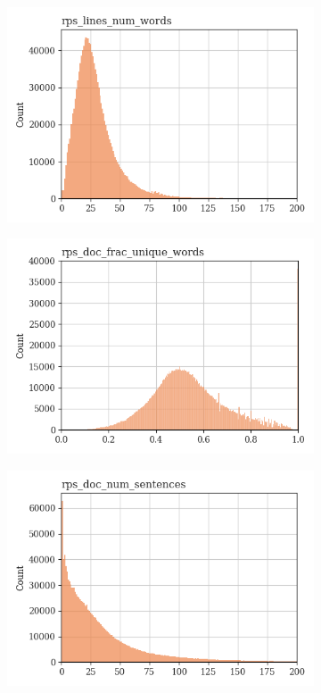 \documentclass{article}
\begin{document}
\begin{figure}
\begin{subfigure}[b]{0.32\textwidth}
         \centering
         \includegraphics[width=\textwidth]{figures/quality_signals/rps_lines_num_words.png}
     \end{subfigure}
     \begin{subfigure}[b]{0.32\textwidth}
         \centering
         \includegraphics[width=\textwidth]{figures/quality_signals/rps_doc_frac_unique_words.png}
     \end{subfigure}
     \hfill
     \begin{subfigure}[b]{0.32\textwidth}
         \centering
         \includegraphics[width=\textwidth]{figures/quality_signals/rps_doc_num_sentences.png}

\end{subfigure}
\end{figure}
\end{document}

